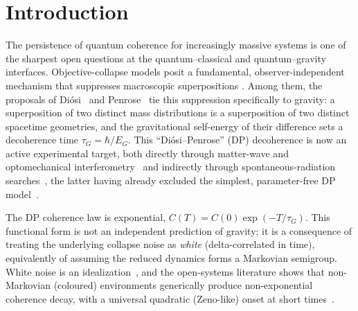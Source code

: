 \documentclass[aps,prd,onecolumn,amsmath,amssymb,nofootinbib,superscriptaddress]{revtex4-2}
\begin{document}
\begin{abstract}
bounds, which constrain only the model's regularization length---the per-nucleon emission
($\propto 1/R_0^3$), decoupled from the ($R_0$-independent) collective decoherence the interferometer
measures ($\propto GM^2/R$)---so the finite-memory modification changes the \emph{onset shape}, not the
radiation phenomenology. We are explicit about scope: the quadratic onset is the
generic signature of non-Markovian decoherence and is shared with other coloured-noise collapse
models, so the test falsifies \emph{strict} Markovian DP/CSL and would be evidence for a
non-Markovian fundamental channel consistent with ISP, but does not by itself single out ISP.
\end{abstract}

\maketitle

\section{Introduction}\label{sec:intro}

The persistence of quantum coherence for increasingly massive systems is one of the sharpest open
questions at the quantum--classical and quantum--gravity interfaces. Objective-collapse models
posit a fundamental, observer-independent mechanism that suppresses macroscopic superpositions
\cite{R4,R5,R6,R7}. Among them, the proposals of Di\'osi~\cite{R2,R3} and Penrose~\cite{R1} tie
this suppression specifically to gravity: a superposition of two distinct mass distributions is a
superposition of two distinct spacetime geometries, and the gravitational self-energy of their
difference sets a decoherence time $\tau_G=\hbar/E_G$. This ``Di\'osi--Penrose'' (DP) decoherence
is now an active experimental target, both directly through matter-wave and optomechanical
interferometry~\cite{R16,R19,R23,R26,R27} and indirectly through spontaneous-radiation
searches~\cite{R8,R9}, the latter having already excluded the simplest, parameter-free DP
model~\cite{R8}.

The DP coherence law is exponential, $C(T)=C(0)\exp(-T/\tau_G)$. This functional form is not an
independent prediction of gravity; it is a consequence of treating the underlying collapse noise as
\emph{white} (delta-correlated in time), equivalently of assuming the reduced dynamics forms a
Markovian semigroup. White noise is an idealization~\cite{R10}, and the open-systems literature
shows that non-Markovian (coloured) environments generically produce non-exponential coherence
decay, with a universal quadratic (Zeno-like) onset at short times~\cite{R15,R21,R22}.
\end{document}
